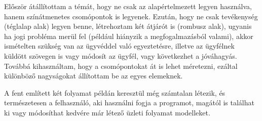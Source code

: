 Először átállítottam a témát, hogy ne csak az alapértelmezett legyen használva, hanem színátmenetes csomópontok is legyenek. Ezután, hogy ne csak tevékenység (téglalap alak) legyen benne, létrehoztam két átjárót is (rombusz alak), ugyanis ha jogi probléma merül fel (például hiányzik a megfogalmazásból valami), akkor ismételten szükség van az ügyvéddel való egyeztetésre, illetve az ügyfélnek küldött szövegen is vagy módosít az ügyfél, vagy következhet a jóváhagyás. Továbbá kihasználtam, hogy a csomópontokat át is lehet méretezni, ezáltal különböző nagyságokat állítottam be az egyes elemeknek.

A fent említett két folyamat példán keresztül még számtalan létezik, és természetesen a felhasználó, aki használni fogja a programot, magától is találhat ki vagy módosíthat kedvére már létező üzleti folyamat modelleket.